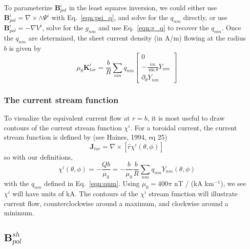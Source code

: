 \documentclass{article}
\newcommand{\B}{\mathbf{B}}
\newcommand{\J}{\mathbf{J}}
\newcommand{\q}{q_{nm}}
\begin{document}
To parameterize $\B_{pol}^i$ in the least squares inversion, we could either use
$\B_{pol}^i = \nabla \times \wedge \Psi^i$ with Eq.~\eqref{eqn:psi_q}, and solve
for the $\q$ directly, or use $\B_{pol}^i = -\nabla V^i$, solve for the $g_{nm}$
and use Eq.~\eqref{eqn:g_q} to recover the $\q$. Once the $\q$ are determined,
the sheet current density (in A/m) flowing at the radius $b$ is given by
\begin{equation}
\mu_0 \mathbf{K}_{tor}^i = \frac{b}{R} \sum_{nm} \q
\left[
\begin{array}{c}
0 \\
-\frac{im}{\sin{\theta}} Y_{nm} \\
\partial_{\theta} Y_{nm}
\end{array}
\right]
\end{equation}

\subsubsection{The current stream function}

To visualize the equivalent current flow at $r = b$, it is most useful to draw contours
of the current stream function $\chi^i$. For a toroidal current, the current stream function is
defined by (see Haines, 1994, eq 25)
\begin{equation}
\J_{tor} = \nabla \times \left[ \hat{r} \chi^i(\theta,\phi) \right]
\end{equation}
so with our definitions,
\begin{equation}
\chi^i(\theta,\phi) = -\frac{Qb}{\mu_0} = -\frac{b}{\mu_0} \frac{b}{R} \sum_{nm} \q Y_{nm}(\theta,\phi)
\end{equation}
with the $\q$ defined in Eq.~\eqref{eqn:qnm}. Using $\mu_0 = 400 \pi$ nT / (kA km$^{-1}$),
we see $\chi^i$ will have units of kA. The contours of the $\chi^i$ stream function will illustrate
current flow, counterclockwise around a maximum, and clockwise around a minimum.

\subsection{$\B_{pol}^{sh}$}
\end{document}
